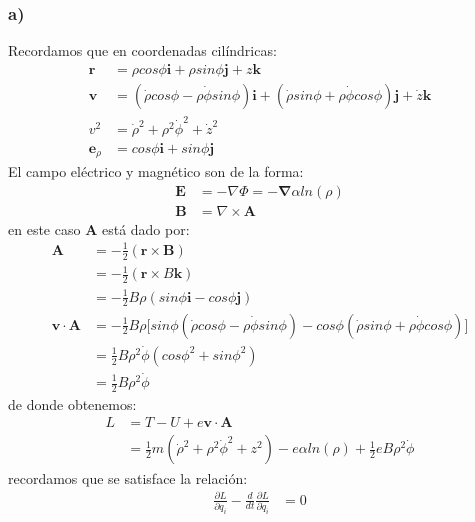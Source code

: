 \documentclass{article}
\begin{document}
\begin{tcolorbox}[breakable]
    \subsubsection*{a)}
    Recordamos que en coordenadas cilíndricas:
    \begin{align*}
        \bm{r} &= \rho cos\phi \bm{i} + \rho sin\phi\bm{j} + z\bm{k} \\
        \bm{v} 
        &=(\dot{\rho} cos\phi - \rho \dot{\phi}sin\phi) \bm{i} 
        + (\dot{\rho}sin\phi + \rho \dot{\phi}cos\phi) \bm{j} 
        + \dot{z}\bm{k} \\
        v^2 &= \dot{\rho}^2 + \rho^2\dot{\phi}^2 + \dot{z}^2 \\ 
        \bm{e}_\rho &= cos\phi \bm{i} + sin\phi \bm{j} 
    \end{align*}
    El campo eléctrico y magnético son de la forma:
    \begin{align*}
        \bm{E} &= -\nabla \Phi = -\bm{\nabla} \alpha ln(\rho) \\ 
        \bm{B} &= \nabla \times \bm{A} 
    \end{align*}
    en este caso $\bm{A}$ está dado por:
    \begin{align*}
        \bm{A} 
        &= -\frac{1}{2}(\bm{r} \times \bm{B}) \\
        &= -\frac{1}{2}(\bm{r} \times B\bm{k}) \\
        &= -\frac{1}{2}B\rho(sin\phi \bm{i} - cos\phi \bm{j}) \\
        \bm{v} \cdot \bm{A} 
        &= -\frac{1}{2}B\rho 
        \bigg[ sin\phi (\dot{\rho} cos\phi - \rho \dot{\phi}sin\phi) 
        -cos\phi (\dot{\rho}sin\phi + \rho \dot{\phi}cos\phi) \bigg] \\
        &= \frac{1}{2}B\rho^2 \dot{\phi}(cos\phi^2 + sin\phi^2) \\
        &= \frac{1}{2}B\rho^2 \dot{\phi} 
    \end{align*}
    de donde obtenemos:
    \begin{align*}
        L 
        &= T - U + e\bm{v} \cdot \bm{A} \\
        &= \frac{1}{2}m(\dot{\rho}^2 + \rho^2\dot{\phi}^2 + z^2) - e\alpha ln(\rho) + \frac{1}{2}eB\rho^2 \dot{\phi}
    \end{align*}
    recordamos que se satisface la relación:
    \begin{align*}
        \frac{\partial L}{\partial q_i} - \frac{d}{dt}\frac{\partial L}{\partial \dot{q}_i} &= 0

\end{align*}
\end{tcolorbox}
\end{document}
